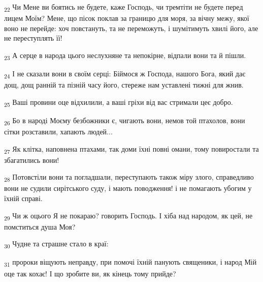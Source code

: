 \begin{tcolorbox}
\textsubscript{22} Чи Мене ви боятись не будете, каже Господь, чи тремтіти не будете перед лицем Моїм? Мене, що пісок поклав за границю для моря, за вічну межу, якої воно не перейде: хоч повстануть, та не переможуть, і шумітимуть хвилі його, але не переступлять її!
\end{tcolorbox}
\begin{tcolorbox}
\textsubscript{23} А серце в народа цього неслухняне та непокірне, відпали вони та й пішли.
\end{tcolorbox}
\begin{tcolorbox}
\textsubscript{24} І не сказали вони в своїм серці: Біймося ж Господа, нашого Бога, який дає дощ, дощ ранній та пізній часу його, стереже нам уставлені тижні для жнив.
\end{tcolorbox}
\begin{tcolorbox}
\textsubscript{25} Ваші провини оце відхилили, а ваші гріхи від вас стримали цеє добро.
\end{tcolorbox}
\begin{tcolorbox}
\textsubscript{26} Бо в народі Моєму безбожники є, чигають вони, немов той птахолов, вони сітки розставили, хапають людей...
\end{tcolorbox}
\begin{tcolorbox}
\textsubscript{27} Як клітка, наповнена птахами, так доми їхні повні омани, тому повиростали та збагатились вони!
\end{tcolorbox}
\begin{tcolorbox}
\textsubscript{28} Потовстіли вони та погладшали, переступають також міру злого, справедливо вони не судили сирітського суду, і мають поводження! і не помагають убогим у їхній справі.
\end{tcolorbox}
\begin{tcolorbox}
\textsubscript{29} Чи ж оцього Я не покараю? говорить Господь. І хіба над народом, як цей, не помститься душа Моя?
\end{tcolorbox}
\begin{tcolorbox}
\textsubscript{30} Чудне та страшне стало в краї:
\end{tcolorbox}
\begin{tcolorbox}
\textsubscript{31} пророки віщують неправду, при помочі їхній панують священики, і народ Мій оце так кохає! І що зробите ви, як кінець тому прийде?
\end{tcolorbox}
